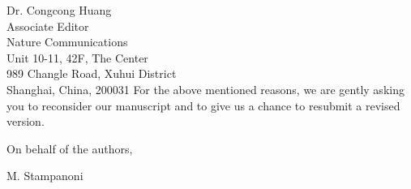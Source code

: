 \documentclass[a4paper,english]{scrlttr2}
\begin{document}
\begin{letter}{Dr. Congcong Huang\\

Associate Editor\\
Nature Communications \\

Unit 10-11, 42F, The Center\\
989 Changle Road, Xuhui District\\
Shanghai, China, 200031}
For the above mentioned reasons, we are gently asking you to reconsider our manuscript and to give us a chance to resubmit a revised version.

\closing{On behalf of the authors,}

M. Stampanoni
\end{letter}
\end{document}
